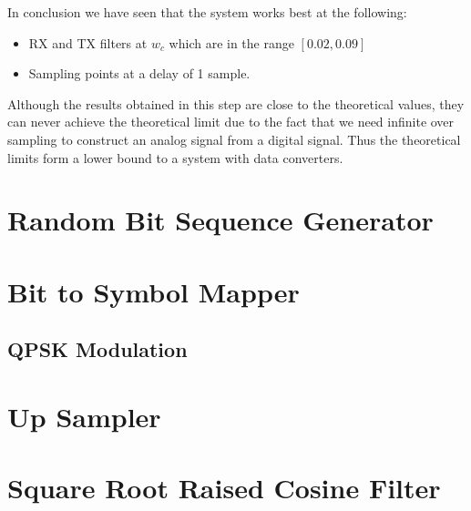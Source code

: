 \documentclass[]{article}
\begin{document}
In conclusion we have seen that the system works best at the following:
\begin{itemize}
\item RX and TX filters  at $w_c$ which are in the range $\left[0.02,0.09\right]  $
\item Sampling points at a delay of 1 sample.
\end{itemize}

Although the results obtained in this step are close to the theoretical values, they can never achieve the theoretical limit due to the fact that we need infinite over sampling to construct an analog signal from a digital signal. Thus the theoretical limits form a lower bound to a system with data converters. 

\appendix
\newpage


\newpage
%

\section{Random Bit Sequence Generator}
\label{app:random_bit_generator}


\section{Bit to Symbol Mapper}
\label{app:bittosym}

\subsection{QPSK Modulation}
\label{app:qpsk_mod}


\section{Up Sampler}
\label{app:impulse_train}


\section{Square Root Raised Cosine Filter}
\label{app:sqrt_raised_cosine}

\end{document}
